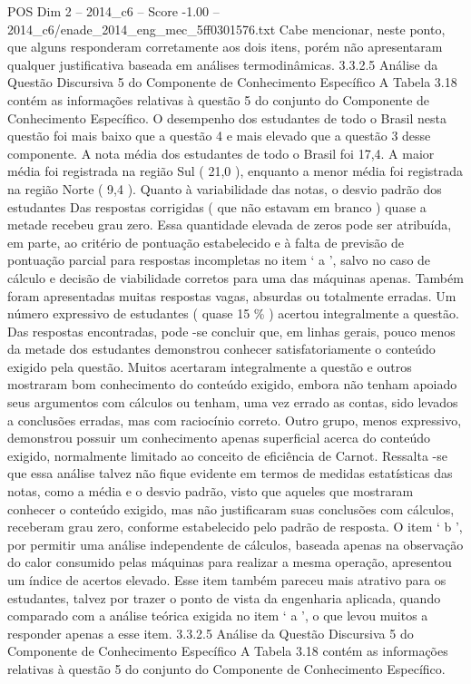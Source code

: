 \begin{textsample}{POS Dim 2 – 2014\_c6 – Score -1.00 – 2014\_c6/enade\_2014\_eng\_mec\_5ff0301576.txt}
Cabe mencionar, neste ponto, que alguns responderam corretamente aos dois itens, porém não apresentaram qualquer justificativa baseada em análises termodinâmicas. 3.3.2.5 Análise da Questão Discursiva 5 do Componente de Conhecimento Específico A Tabela 3.18 contém as informações relativas à questão 5 do conjunto do Componente de Conhecimento Específico.
O desempenho dos estudantes de todo o Brasil nesta questão foi mais baixo que a questão 4 e mais elevado que a questão 3 desse componente.
A nota média dos estudantes de todo o Brasil foi 17,4.
A maior média foi registrada na região Sul ( 21,0 ), enquanto a menor média foi registrada na região Norte ( 9,4 ).
Quanto à variabilidade das notas, o desvio padrão dos estudantes Das respostas corrigidas ( que não estavam em branco ) quase a metade recebeu grau zero.
Essa quantidade elevada de zeros pode ser atribuída, em parte, ao critério de pontuação estabelecido e à falta de previsão de pontuação parcial para respostas incompletas no item ‘ a ’, salvo no caso de cálculo e decisão de viabilidade corretos para uma das máquinas apenas.
Também foram apresentadas muitas respostas vagas, absurdas ou totalmente erradas.
Um número expressivo de estudantes ( quase 15 \% ) acertou integralmente a questão.
Das respostas encontradas, pode -se concluir que, em linhas gerais, pouco menos da metade dos estudantes demonstrou conhecer satisfatoriamente o conteúdo exigido pela questão.
Muitos acertaram integralmente a questão e outros mostraram bom conhecimento do conteúdo exigido, embora não tenham apoiado seus argumentos com cálculos ou tenham, uma vez errado as contas, sido levados a conclusões erradas, mas com raciocínio correto.
Outro grupo, menos expressivo, demonstrou possuir um conhecimento apenas superficial acerca do conteúdo exigido, normalmente limitado ao conceito de eficiência de Carnot.
Ressalta -se que essa análise talvez não fique evidente em termos de medidas estatísticas das notas, como a média e o desvio padrão, visto que aqueles que mostraram conhecer o conteúdo exigido, mas não justificaram suas conclusões com cálculos, receberam grau zero, conforme estabelecido pelo padrão de resposta.
O item ‘ b ’, por permitir uma análise independente de cálculos, baseada apenas na observação do calor consumido pelas máquinas para realizar a mesma operação, apresentou um índice de acertos elevado.
Esse item também pareceu mais atrativo para os estudantes, talvez por trazer o ponto de vista da engenharia aplicada, quando comparado com a análise teórica exigida no item ‘ a ’, o que levou muitos a responder apenas a esse item. 3.3.2.5 Análise da Questão Discursiva 5 do Componente de Conhecimento Específico A Tabela 3.18 contém as informações relativas à questão 5 do conjunto do Componente de Conhecimento Específico.

\end{textsample}
